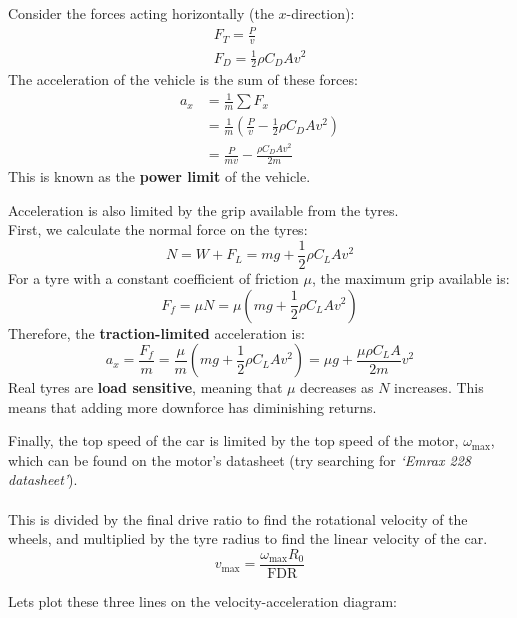 \begin{frame}
    Consider the forces acting horizontally (the $x$-direction):
    \begin{gather*}
        F_T = \frac{P}{v} \\
        F_D = \frac{1}{2} \rho C_D A v^2
    \end{gather*}
    The acceleration of the vehicle is the sum of these forces:
    \begin{align*}
        a_x &= \frac{1}{m} \sum F_x \\
        &= \frac{1}{m} \left(\frac{P}{v} - \frac{1}{2} \rho C_D A v^2\right) \\
        &= \frac{P}{mv} - \frac{\rho C_D A v^2}{2m}
    \end{align*}
    This is known as the \textbf{power limit} of the vehicle.
\end{frame}

\begin{frame}
    Acceleration is also limited by the grip available from the tyres. \\
    First, we calculate the normal force on the tyres:
    $$N = W + F_L = mg + \frac{1}{2} \rho C_L A v^2$$
    For a tyre with a constant coefficient of friction $\mu$, the maximum grip available is:
    $$F_f = \mu N = \mu \left(mg + \frac{1}{2} \rho C_L A v^2\right)$$
    Therefore, the \textbf{traction-limited} acceleration is:
    $$a_x = \frac{F_f}{m}
    = \frac{\mu}{m} \left(mg + \frac{1}{2} \rho C_L A v^2\right)
    = \mu g + \frac{\mu \rho C_L A}{2m} v^2$$
    Real tyres are \textbf{load sensitive},
    meaning that $\mu$ decreases as $N$ increases.
    This means that adding more downforce has diminishing returns.
\end{frame}

\begin{frame}
    Finally, the top speed of the car is limited
    by the top speed of the motor, $\omega_\text{max}$,
    which can be found on the motor's datasheet
    (try searching for \textit{`Emrax 228 datasheet'}). \\~\\
    This is divided by the final drive ratio
    to find the rotational velocity of the wheels,
    and multiplied by the tyre radius to find the linear velocity of the car.
    $$v_\text{max} = \frac{\omega_\text{max} R_0}{\text{FDR}}$$
\end{frame}

\begin{frame}
    Lets plot these three lines on the velocity-acceleration diagram:
\end{frame}